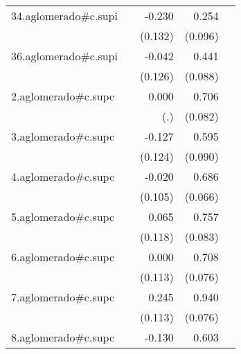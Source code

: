 {\begin{longtable}{l*{4}{D{.}{.}{-1}}}
\addlinespace
34.aglomerado#c.supi&                     &      -0.230         &       0.254\sym{**} &                     \\
            &                     &     (0.132)         &     (0.096)         &                     \\
\addlinespace
36.aglomerado#c.supi&                     &      -0.042         &       0.441\sym{***}&                     \\
            &                     &     (0.126)         &     (0.088)         &                     \\
\addlinespace
2.aglomerado#c.supc&                     &       0.000         &       0.706\sym{***}&                     \\
            &                     &         (.)         &     (0.082)         &                     \\
\addlinespace
3.aglomerado#c.supc&                     &      -0.127         &       0.595\sym{***}&                     \\
            &                     &     (0.124)         &     (0.090)         &                     \\
\addlinespace
4.aglomerado#c.supc&                     &      -0.020         &       0.686\sym{***}&                     \\
            &                     &     (0.105)         &     (0.066)         &                     \\
\addlinespace
5.aglomerado#c.supc&                     &       0.065         &       0.757\sym{***}&                     \\
            &                     &     (0.118)         &     (0.083)         &                     \\
\addlinespace
6.aglomerado#c.supc&                     &       0.000         &       0.708\sym{***}&                     \\
            &                     &     (0.113)         &     (0.076)         &                     \\
\addlinespace
7.aglomerado#c.supc&                     &       0.245\sym{*}  &       0.940\sym{***}&                     \\
            &                     &     (0.113)         &     (0.076)         &                     \\
\addlinespace
8.aglomerado#c.supc&                     &      -0.130         &       0.603\sym{***}&                     \\

\end{longtable}}
